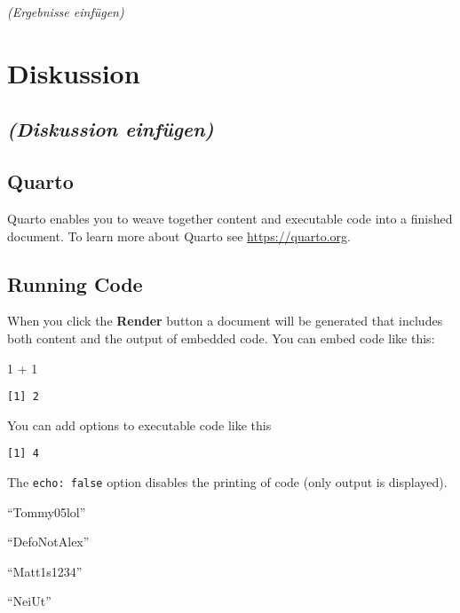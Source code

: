 \documentclass[
  12pt,
  a4paper,
]{article}
\newenvironment{Shaded}{\begin{snugshade}}{\end{snugshade}}
\newcommand{\DecValTok}[1]{\textcolor[rgb]{0.68,0.00,0.00}{#1}}
\newcommand{\SpecialCharTok}[1]{\textcolor[rgb]{0.37,0.37,0.37}{#1}}
\begin{document}
\emph{(Ergebnisse einfügen)}

\section{Diskussion}\label{diskussion}

\subsection{\texorpdfstring{\emph{(Diskussion
einfügen)}}{(Diskussion einfügen)}}\label{diskussion-einfuxfcgen}

\subsection{Quarto}\label{quarto}

Quarto enables you to weave together content and executable code into a
finished document. To learn more about Quarto see
\url{https://quarto.org}.

\subsection{Running Code}\label{running-code}

When you click the \textbf{Render} button a document will be generated
that includes both content and the output of embedded code. You can
embed code like this:

\begin{Shaded}
\begin{Highlighting}[]
\DecValTok{1} \SpecialCharTok{+} \DecValTok{1}
\end{Highlighting}
\end{Shaded}

\begin{verbatim}
[1] 2
\end{verbatim}

You can add options to executable code like this

\begin{verbatim}
[1] 4
\end{verbatim}

The \texttt{echo:\ false} option disables the printing of code (only
output is displayed).

``Tommy05lol''

``DefoNotAlex''

``Matt1s1234''

``NeiUt''
\end{document}
